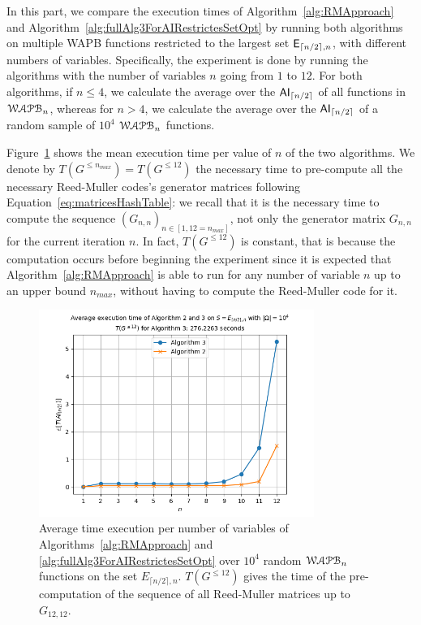 \documentclass[11pt]{llncs}
\begin{document}
In this part, we compare the execution times of Algorithm~\ref{alg:RMApproach} and Algorithm~\ref{alg:fullAlg3ForAIRestrictesSetOpt} by running both algorithms on multiple WAPB functions restricted to the largest set $\mathsf{E}_{\lceil{n/2}\rceil,n}$, with different numbers of variables. 
Specifically, the experiment is done by running the algorithms with the number of variables $n$ going from $1$ to $12$. For both algorithms, if $n \leq 4$, we calculate the average over the $\mathsf{AI}_{\lceil{n/2}\rceil}$ of all functions in $\mathcal{WAPB}_{n}$, whereas for $n > 4$, we calculate the average over the $\mathsf{AI}_{\lceil{n/2}\rceil}$ of a random sample of $10^4$ $\mathcal{WAPB}_{n}$ functions.

Figure~\ref{fig:compTimePlot} shows the mean execution time per value of $n$ of the two algorithms.
We denote by $T\left(G^{\leq n_{max}}\right) = T\left(G^{\leq 12} \right)$ the necessary time to pre-compute all the necessary Reed-Muller codes's generator matrices following Equation~\eqref{eq:matricesHashTable}: we recall that it is the necessary time to compute the sequence $\left(G_{n,n}\right)_{n\in [1,12=n_{max}]}$, not only the generator matrix $G_{n,n}$ for the current iteration $n$. 
In fact, $T\left(G^{\leq 12}\right)$ is constant, that is because the computation occurs before beginning the experiment since it is expected that Algorithm~\ref{alg:RMApproach} is able to run for any number of variable $n$ up to an upper bound $n_{max}$, without having to compute the Reed-Muller code for it. 

\begin{figure}
    \centering
    \includegraphics[width=0.8\textwidth]{images/plot_n_12_sample_10000.png}
    \caption{Average time execution per number of variables of Algorithms~\ref{alg:RMApproach} and \ref{alg:fullAlg3ForAIRestrictesSetOpt} over $10^4$ random $\mathcal{WAPB}_{n}$ functions on the set $E_{\lceil{n/2}\rceil,n}$. 
    $T\left(G^{\leq 12}\right)$ gives the time of the pre-computation of the sequence of all Reed-Muller matrices up to $G_{12,12}$.}\label{fig:compTimePlot}
\end{figure}
\end{document}

